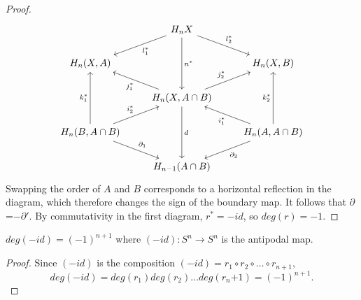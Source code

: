 \begin{proof}
\[\begin{tikzcd}
                                                                                  & H_n X \arrow[ld, "l_1^*"] \arrow[rd, "l_2^*"] \arrow[dd, "n^*"]          &                                                                                   \\
{H_n(X,A)}                                                                        &                                                                          & {H_n(X,B)}                                                                        \\
                                                                                  & {H_n(X,A\cap B)} \arrow[ru, "j_2^*"] \arrow[lu, "j_1^*"] \arrow[dd, "d"] &                                                                                   \\
{H_n(B,A\cap B)} \arrow[uu, "k_1^*"] \arrow[ru, "i_2^*"] \arrow[rd, "\partial_1"] &                                                                          & {H_n(A,A\cap B)} \arrow[uu, "k_2^*"] \arrow[lu, "i_1^*"] \arrow[ld, "\partial_2"] \\
                                                                                  & H_{n-1}(A\cap B)                                                         &                                                                                  
\end{tikzcd}\] Swapping the order of $A$ and $B$ corresponds to a horizontal reflection in the diagram, which therefore changes the sign of the boundary map. It follows that $\partial$=$-\partial'$. By commutativity in the first diagram, $r^*=-id$, so $deg(r)=-1$.

\end{proof}

\begin{corollary}\label{antipodal-degree}
$deg(-id)=(-1)^{n+1}$ where $(-id):S^n\rightarrow S^n$ is the antipodal map.
\end{corollary}
\begin{proof}
Since $(-id)$ is the composition $(-id)=r_1\circ r_2 \circ \dots \circ r_{n+1}$, $$deg(-id)=deg(r_1)deg(r_2)\dots deg(r_n{+1})=(-1)^{n+1}.$$
\cite{Hatcher}
\end{proof}

